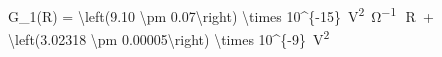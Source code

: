 G_1(R) = \SI[parse-numbers = false]{\left(9.10 \pm 0.07\right) \times 10^{-15}}{\volt^2\per\ohm}\, \cdot \,R\, + \SI[parse-numbers = false]{\left(3.02318 \pm 0.00005\right) \times 10^{-9}}{\volt^2}